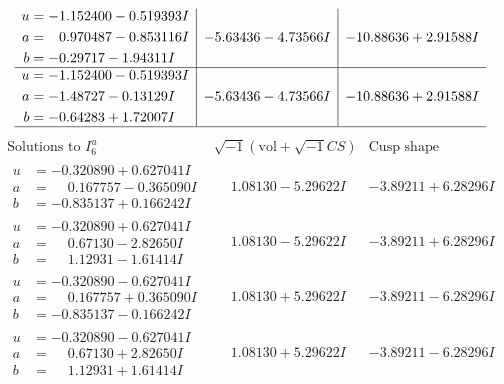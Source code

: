 \documentclass[1p]{elsarticle_modified}
\theoremstyle{definition}
\newcommand{\I}{\sqrt{-1}}
\begin{document}
$$\begin{array}{c|c|c}
\begin{aligned}
u &= -1.152400 - 0.519393 I \\
a &= \phantom{-}0.970487 - 0.853116 I \\
b &= -0.29717 - 1.94311 I\end{aligned}
 & -5.63436 - 4.73566 I & -10.88636 + 2.91588 I \\ \hline\begin{aligned}
u &= -1.152400 - 0.519393 I \\
a &= -1.48727 - 0.13129 I \\
b &= -0.64283 + 1.72007 I\end{aligned}
 & -5.63436 - 4.73566 I & -10.88636 + 2.91588 I\\
 \hline 
 \end{array}$$\newpage$$\begin{array}{c|c|c}  
\text{Solutions to }I^u_{6}& \I (\text{vol} + \sqrt{-1}CS) & \text{Cusp shape}\\
 \hline 
\begin{aligned}
u &= -0.320890 + 0.627041 I \\
a &= \phantom{-}0.167757 - 0.365090 I \\
b &= -0.835137 + 0.166242 I\end{aligned}
 & \phantom{-}1.08130 - 5.29622 I & -3.89211 + 6.28296 I \\ \hline\begin{aligned}
u &= -0.320890 + 0.627041 I \\
a &= \phantom{-}0.67130 - 2.82650 I \\
b &= \phantom{-}1.12931 - 1.61414 I\end{aligned}
 & \phantom{-}1.08130 - 5.29622 I & -3.89211 + 6.28296 I \\ \hline\begin{aligned}
u &= -0.320890 - 0.627041 I \\
a &= \phantom{-}0.167757 + 0.365090 I \\
b &= -0.835137 - 0.166242 I\end{aligned}
 & \phantom{-}1.08130 + 5.29622 I & -3.89211 - 6.28296 I \\ \hline\begin{aligned}
u &= -0.320890 - 0.627041 I \\
a &= \phantom{-}0.67130 + 2.82650 I \\
b &= \phantom{-}1.12931 + 1.61414 I\end{aligned}
 & \phantom{-}1.08130 + 5.29622 I & -3.89211 - 6.28296 I \\ \hline\begin{aligned}

\end{aligned}
\end{array}$$
\end{document}
